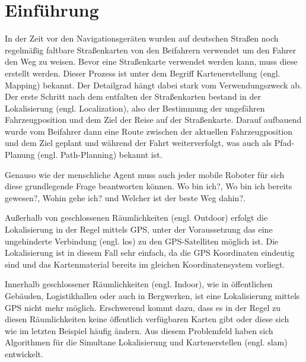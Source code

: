 \chapter{Einführung}

In der Zeit vor den Navigationsgeräten wurden auf deutschen Straßen noch regelmäßig faltbare Straßenkarten von den Beifahrern verwendet um den Fahrer den Weg zu weisen. Bevor eine Straßenkarte verwendet werden kann, muss diese erstellt werden. Dieser Prozess ist unter dem Begriff Kartenerstellung (engl. Mapping) bekannt. Der Detailgrad hängt dabei stark vom Verwendungszweck ab. Der erste Schritt nach dem entfalten der Straßenkarten bestand in der Lokalisierung (engl. Localization), also der Bestimmung der ungefähren Fahrzeugposition und dem Ziel der Reise auf der Straßenkarte. Darauf aufbauend wurde vom Beifahrer dann eine Route zwischen der aktuellen Fahrzeugposition und dem Ziel geplant und während der Fahrt weiterverfolgt, was auch als Pfad-Planung (engl. Path-Planning) bekannt ist.

Genauso wie der menschliche Agent muss auch jeder mobile Roboter für sich diese grundlegende Frage beantworten können. \glqq Wo bin ich?\grqq{}, \glqq Wo bin ich bereits gewesen?\grqq, \glqq Wohin gehe ich?\grqq{} und \glqq Welcher ist der beste Weg dahin?\grqq{}\cite{murphy2000introduction}.

Außerhalb von geschlossenen Räumlichkeiten (engl. Outdoor) erfolgt die Lokalisierung in der Regel mittels GPS, unter der Voraussetzung das eine ungehinderte Verbindung (engl. \acrfull{los}) zu den GPS-Satelliten möglich ist. Die Lokalisierung ist in diesem Fall sehr einfach, da die GPS Koordinaten eindeutig sind und das Kartenmaterial bereits im gleichen Koordinatensystem vorliegt.

Innerhalb geschlossener Räumlichkeiten (engl. Indoor), wie in öffentlichen Gebäuden, Logistikhallen oder auch in Bergwerken, ist eine Lokalisierung mittels GPS nicht mehr möglich. Erschwerend kommt dazu, dass es in der Regel zu diesen Räumlichkeiten keine öffentlich verfügbaren Karten gibt oder diese sich wie im letzten Beispiel häufig ändern. Aus diesem Problemfeld haben sich Algorithmen für die Simultane Lokalisierung und Kartenerstellen (engl. \Gls{slam}) entwickelt.

